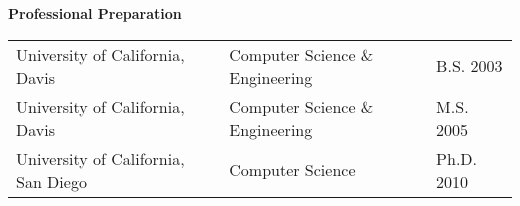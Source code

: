 \documentclass[10pt]{article}
\newcommand{\schighlight}[1]{{#1}}
\newcommand{\marker}{*\hspace*{.3em}}
\newcommand{\secfont}[1]{\textbf{\Large{#1}}\medskip}
\newcommand{\myitemizeend}{
    \end{list}  }
\begin{document}
{%
\noindent\secfont{Professional Preparation}

\begin{tabular}{lll}
  \schighlight{University of California, Davis}  & Computer Science \& Engineering & B.S. 2003\\
  \schighlight{University of California, Davis}  & Computer Science \& Engineering & M.S. 2005\\
  \schighlight{University of California, San Diego}  & Computer Science & Ph.D. 2010
\end{tabular}



\iffalse
\halign{\hspace{2em} #\hfil  &\hspace{2em} #\hfil  &\hspace{4.5em}\hfil  # \cr
            \marker  \emph{University of California, San Diego}
                    & Ph.D. in Computer Science \hspace*{10em}& \textsf{June 2010}\cr}\smallskip

\noindent \hspace*{3em}Advisor: Professor Mihir Bellare 

\bigskip


\halign{ \hspace*{2em} #\hfil  &\hspace{2em} #\hfil  &\hspace{4.5em}\hfil  # \cr
			\marker  \emph{University of California, Davis}\hspace*{2em}
                    & M.S. in Computer Science \hspace*{10.45em}& \emph{June 2005}\cr}\smallskip

\noindent \hspace*{3em}Advisor: Professor Matt Bishop  \hspace*{3.8em}
``Time Stamp Synchronization of Distributed Sensor Logs:\\ 
\hspace*{21.2em}
 Impossibility Results and Approximation Algorithms''

\bigskip

\halign{\hspace*{3em} #\hfil  &\hspace{2em} #\hfil  &\hspace{8.5em}\hfil  # \cr
            \marker  \emph{University of California, Davis}\hspace*{2em}
                    & B.S. in Computer Science \& Engineering & \emph{June 2003}\cr}
					\fi
}
\bigskip
\end{document}
